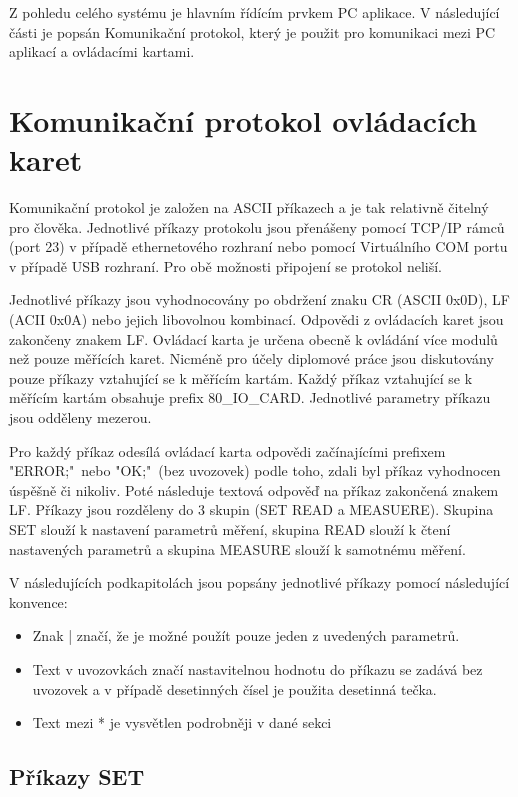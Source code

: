 Z pohledu celého systému je hlavním řídícím prvkem PC aplikace. V následující části je popsán Komunikační
protokol, který je použit pro komunikaci mezi PC aplikací a ovládacími kartami.

\section{Komunikační protokol ovládacích karet}
Komunikační protokol je založen na ASCII příkazech a je tak relativně čitelný pro člověka.
Jednotlivé příkazy protokolu jsou přenášeny pomocí TCP/IP rámců (port 23) v případě ethernetového rozhraní nebo
pomocí Virtuálního COM portu v případě USB rozhraní. Pro obě možnosti připojení se protokol neliší.\par

Jednotlivé příkazy jsou vyhodnocovány po obdržení znaku CR (ASCII 0x0D), LF (ACII 0x0A) nebo jejich libovolnou kombinací. Odpovědi
z ovládacích karet jsou zakončeny znakem LF. Ovládací karta je určena obecně k ovládání více modulů než pouze měřících karet. Nicméně pro účely
diplomové práce jsou diskutovány pouze příkazy vztahující se k měřícím kartám. Každý příkaz vztahující se k měřícím kartám obsahuje prefix 80\_IO\_CARD.
Jednotlivé parametry příkazu jsou odděleny mezerou.\par

Pro každý příkaz odesílá ovládací karta odpovědi začínajícími
prefixem "ERROR;"\ nebo "OK;"\ (bez uvozovek) podle toho, zdali byl příkaz vyhodnocen úspěšně či nikoliv.
Poté následuje textová odpověď na příkaz zakončená znakem LF.
Příkazy jsou rozděleny do 3 skupin (SET READ a MEASUERE).
Skupina SET slouží k nastavení parametrů měření, skupina READ slouží k čtení nastavených parametrů
a skupina MEASURE slouží k samotnému měření.\par

V následujících podkapitolách jsou popsány jednotlivé příkazy pomocí následující konvence:
\begin{itemize}
    \item Znak | značí, že je možné použít pouze jeden z uvedených parametrů.
    \item Text v uvozovkách značí nastavitelnou hodnotu do příkazu se zadává bez uvozovek a v případě desetinných čísel je použita desetinná tečka.
    \item Text mezi * je vysvětlen podrobněji v dané sekci
    
\end{itemize}

\subsection{Příkazy SET}
